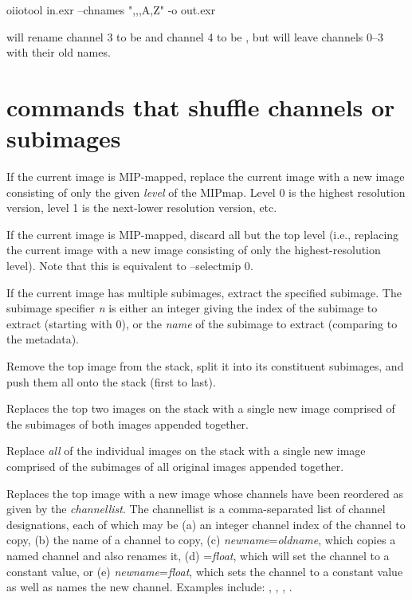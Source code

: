 \begin{code}
    oiiotool in.exr --chnames ",,,A,Z" -o out.exr
\end{code}

\noindent will rename channel 3 to be  and channel 4 to be
, but will leave channels 0--3 with their old names.
\apiend


\section{\oiiotool commands that shuffle channels or subimages}

If the current image is MIP-mapped, replace the current image with a new
image consisting of only the given \emph{level} of the MIPmap.
Level 0 is the highest resolution version, level 1 is the next-lower
resolution version, etc.
\apiend

If the current image is MIP-mapped, discard all but the top level
(i.e., replacing the current image with a new image consisting of only the
highest-resolution level).  Note that this is equivalent to 
{\cf --selectmip 0}.
\apiend

If the current image has multiple subimages, extract the specified subimage.
The subimage specifier \emph{n} is either an integer giving the index
of the subimage to extract (starting with 0), or the \emph{name} of the
subimage to extract (comparing to the  metadata).
\apiend

Remove the top image from the stack, split it into its constituent
subimages, and push them all onto the stack (first to last).
\apiend

Replaces the top two images on the stack with a single new image comprised
of the subimages of both images appended together.
\apiend

Replace \emph{all} of the individual images on the stack with a single new
image comprised of the subimages of all original images appended together.
\apiend

\label{sec:oiiotool:ch}
Replaces the top image with a new image whose channels have been
reordered as given by the \emph{channellist}.  The {\cf channellist}
is a comma-separated list of channel designations, each of which may be
(a) an integer channel index of the channel to copy,
(b) the name of a channel to copy,
(c) \emph{newname}{\cf =}\emph{oldname}, which copies a named channel and
also renames it,
(d) {\cf =}\emph{float}, which will set the channel to a constant value,
or
(e) \emph{newname}{\cf =}\emph{float},
which sets the channel to a constant value as well as names the new channel.
Examples include:  , , ,
.

